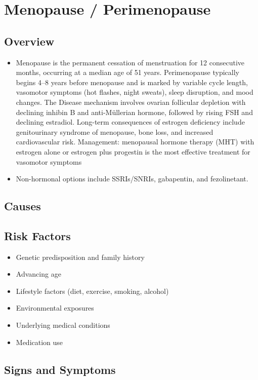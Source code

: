 \chapter{Menopause / Perimenopause}
\label{sec:Menopause}

\section{Overview}


\begin{itemize}[noitemsep]
  \item Menopause is the permanent cessation of menstruation for 12 consecutive months, occurring at a median age of 51 years. Perimenopause typically begins 4--8 years before menopause and is marked by variable cycle length, vasomotor symptoms (hot flashes, night sweats), sleep disruption, and mood changes. The Disease mechanism involves ovarian follicular depletion with declining inhibin B and anti-M\"ullerian hormone, followed by rising FSH and declining estradiol. Long-term consequences of estrogen deficiency include genitourinary syndrome of menopause, bone loss, and increased cardiovascular risk. Management: menopausal hormone therapy (MHT) with estrogen alone or estrogen plus progestin is the most effective treatment for vasomotor symptoms
  \item Non-hormonal options include SSRIs/SNRIs, gabapentin, and fezolinetant.
\end{itemize}
\section{Causes}
\section{Risk Factors}

\begin{itemize}[noitemsep]
  \item Genetic predisposition and family history
  \item Advancing age
  \item Lifestyle factors (diet, exercise, smoking, alcohol)
  \item Environmental exposures
  \item Underlying medical conditions
  \item Medication use
\end{itemize}
\section{Signs and Symptoms}

